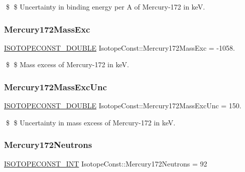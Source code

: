 \$ \$ Uncertainty in binding energy per A of Mercury-\/172 in keV. \mbox{\label{group___isotope_const-_mercury-_hg172_ga0237586aefe9c8e0cf9e17d1a16efc98}} 
\subsubsection{\texorpdfstring{Mercury172\+Mass\+Exc}{Mercury172MassExc}}
{\footnotesize\ttfamily \mbox{\hyperlink{group___isotope_const-_macros_ga8f45a7272ce02c0b4c65c44636ed719a}{I\+S\+O\+T\+O\+P\+E\+C\+O\+N\+S\+T\+\_\+\+D\+O\+U\+B\+LE}} Isotope\+Const\+::\+Mercury172\+Mass\+Exc = -\/1058.}

\$ \$ Mass excess of Mercury-\/172 in keV. \mbox{\label{group___isotope_const-_mercury-_hg172_gac911fdf2d5670a30c5bbdde89abc557a}} 
\subsubsection{\texorpdfstring{Mercury172\+Mass\+Exc\+Unc}{Mercury172MassExcUnc}}
{\footnotesize\ttfamily \mbox{\hyperlink{group___isotope_const-_macros_ga8f45a7272ce02c0b4c65c44636ed719a}{I\+S\+O\+T\+O\+P\+E\+C\+O\+N\+S\+T\+\_\+\+D\+O\+U\+B\+LE}} Isotope\+Const\+::\+Mercury172\+Mass\+Exc\+Unc = 150.}

\$ \$ Uncertainty in mass excess of Mercury-\/172 in keV. \mbox{\label{group___isotope_const-_mercury-_hg172_ga8f8b3aa7e2f68519b4fe99427813e88f}} 
\subsubsection{\texorpdfstring{Mercury172\+Neutrons}{Mercury172Neutrons}}
{\footnotesize\ttfamily \mbox{\hyperlink{group___isotope_const-_macros_ga5f18360b3e99483a35c32d789e62621c}{I\+S\+O\+T\+O\+P\+E\+C\+O\+N\+S\+T\+\_\+\+I\+NT}} Isotope\+Const\+::\+Mercury172\+Neutrons = 92}


